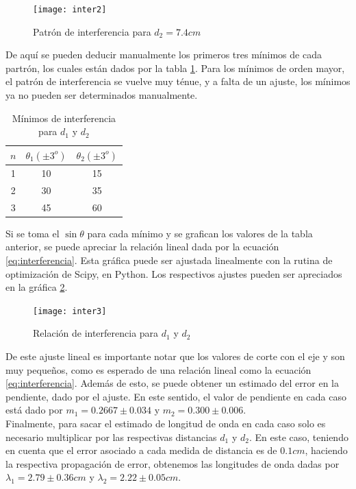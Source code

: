 \documentclass[%
 reprint,
 amsmath,amssymb,
 aps,
]{revtex4-1}
\begin{document}
\begin{figure}[h!]
\centering
\texttt{[image: inter2]}
\caption{Patrón de interferencia para $d_2 = 7.4cm$}
\label{fig:inter2}
\end{figure}

De aquí se pueden deducir manualmente los primeros  tres mínimos de cada partrón, los cuales están dados por la tabla \ref{table:minimos}. Para los mínimos de orden mayor, el patrón de interferencia se vuelve muy ténue, y a falta de un ajuste, los mínimos ya no pueden ser determinados manualmente.\\


\begin{table}[h!]
\centering
\begin{tabular}{|c|c|c|}
	\hline $n $ & $ \theta_1 (\pm 3^o) $ & $ \theta_2 (\pm 3^o) $ \\ 
	\hline\hline
	1 & 10 & 15 \\
	2 & 30 & 35 \\
	3 & 45 & 60 \\
	[1ex] 
 \hline
 \end{tabular} 
  \caption{Mínimos de interferencia para $d_1$ y $d_2$}
\label{table:minimos} 
\end{table}

Si se toma el $\sin{\theta}$ para cada mínimo y se grafican los valores de la tabla anterior, se puede apreciar la relación lineal dada por la ecuación \ref{eq:interferencia}. Esta gráfica puede ser ajustada linealmente con la rutina de optimización de Scipy, en Python. Los respectivos ajustes pueden ser apreciados en  la gráfica \ref{fig:inter3}.\\

\begin{figure}[h!]
\centering
\texttt{[image: inter3]}
\caption{Relación de interferencia para $d_1$ y $d_2$}
\label{fig:inter3}
\end{figure}

De este ajuste lineal es importante notar que los valores de corte con el eje y son muy pequeños, como es esperado de una relación lineal como la ecuación \ref{eq:interferencia}. Además de esto, se puede obtener un estimado del error en la pendiente, dado por el ajuste. En este sentido, el valor de pendiente  en cada caso está dado por $m_1 = 0.2667 \pm 0.034$ y $m_2 = 0.300 \pm 0.006$. \\

Finalmente, para sacar el estimado de longitud de onda en cada caso solo es necesario multiplicar por las respectivas distancias $d_1$ y $d_2$. En este caso, teniendo en cuenta que el error asociado a cada medida de distancia es de $0.1cm$, haciendo la respectiva propagación de error, obtenemos las longitudes de onda dadas por $\lambda_1 = 2.79 \pm 0.36cm$ y $\lambda_2 = 2.22 \pm 0.05cm$.\\
\end{document}
